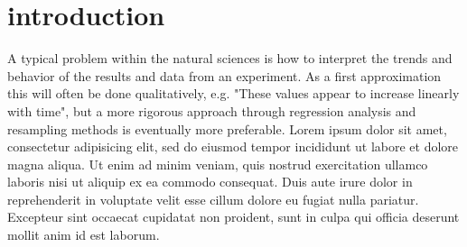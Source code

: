 \section{introduction}
A typical problem within the natural sciences is how to interpret the trends and behavior of the results and data from an experiment. As a first approximation this will often be done qualitatively, e.g. "These values appear to increase linearly with time", but a more rigorous approach through regression analysis and resampling methods is eventually more preferable.
Lorem ipsum dolor sit amet, consectetur adipisicing elit, sed do eiusmod
tempor incididunt ut labore et dolore magna aliqua. Ut enim ad minim veniam,
quis nostrud exercitation ullamco laboris nisi ut aliquip ex ea commodo
consequat. Duis aute irure dolor in reprehenderit in voluptate velit esse
cillum dolore eu fugiat nulla pariatur. Excepteur sint occaecat cupidatat non
proident, sunt in culpa qui officia deserunt mollit anim id est laborum.